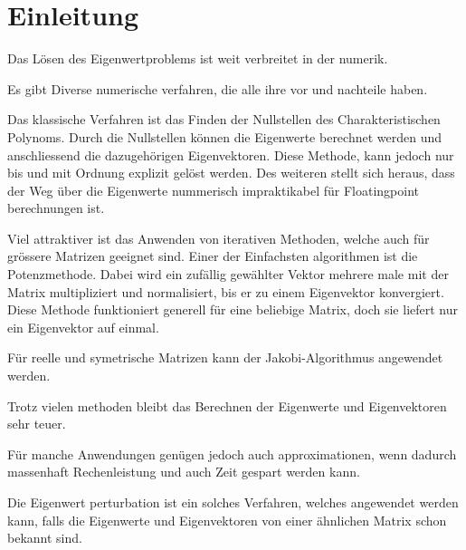 %
%
%
\section{Einleitung\label{perturbation2:section:einleitung}}

Das Lösen des Eigenwertproblems ist  weit verbreitet in der numerik.

Es gibt Diverse numerische verfahren, die alle ihre vor und nachteile haben.

Das klassische Verfahren ist das Finden der Nullstellen des Charakteristischen Polynoms.
Durch die Nullstellen können die Eigenwerte berechnet werden und anschliessend die dazugehörigen Eigenvektoren.
Diese Methode, kann jedoch nur bis und mit Ordnung explizit gelöst werden.
Des weiteren stellt sich heraus, dass der Weg über die Eigenwerte nummerisch impraktikabel für Floatingpoint berechnungen ist. 

Viel attraktiver ist das Anwenden von iterativen Methoden, welche auch für grössere Matrizen geeignet sind.
Einer der Einfachsten algorithmen ist die Potenzmethode.
Dabei wird ein zufällig gewählter Vektor mehrere male mit der Matrix multipliziert und normalisiert, bis er zu einem Eigenvektor konvergiert.
Diese Methode funktioniert generell für eine beliebige Matrix, doch sie liefert nur ein Eigenvektor auf einmal.

Für reelle und symetrische Matrizen kann der Jakobi-Algorithmus angewendet werden. %

Trotz vielen methoden bleibt das Berechnen der Eigenwerte und Eigenvektoren sehr teuer.

Für manche Anwendungen genügen jedoch auch approximationen, wenn dadurch massenhaft Rechenleistung und auch Zeit gespart werden kann.

Die Eigenwert perturbation ist ein solches Verfahren, welches angewendet werden kann, falls die Eigenwerte und Eigenvektoren von einer ähnlichen Matrix schon bekannt sind.